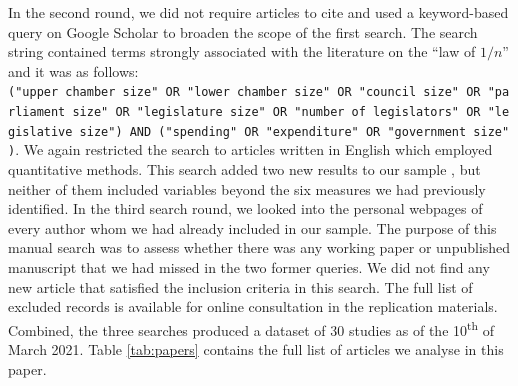 \documentclass[11pt,a4paper,]{article}
\begin{document}
In the second round, we did not require articles to cite
\citet{weingast1981political} and used a keyword-based query on Google
Scholar to broaden the scope of the first search. The search string
contained terms strongly associated with the literature on the ``law of
\(1/n\)'' and it was as follows:
\texttt{("upper\ chamber\ size"\ OR\ "lower\ chamber\ size"\ OR\ "council\ size"\ OR\ "parliament\ size"\ OR\ "legislature\ size"\ OR\ "number\ of\ legislators"\ OR\ "legislative\ size")\ AND\ ("spending"\ OR\ "expenditure"\ OR\ "government\ size")}.
We again restricted the search to articles written in English which
employed quantitative methods. This search added two new results to our
sample \citep{coate2011government, debenedetto2018effect}, but neither
of them included variables beyond the six measures we had previously
identified. In the third search round, we looked into the personal
webpages of every author whom we had already included in our sample. The
purpose of this manual search was to assess whether there was any
working paper or unpublished manuscript that we had missed in the two
former queries. We did not find any new article that satisfied the
inclusion criteria in this search. The full list of excluded records is
available for online consultation in the replication materials.
Combined, the three searches produced a dataset of 30 studies as of the
10\textsuperscript{th} of March 2021. Table \ref{tab:papers} contains
the full list of articles we analyse in this paper.
\end{document}
